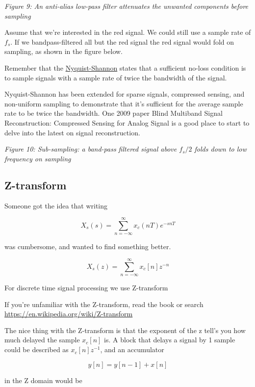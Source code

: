 \emph{Figure 9: An anti-alias low-pass filter attenuates the unwanted
components before sampling}

Assume that we're interested in the red signal. We could still use a
sample rate of \(f_s\). If we bandpass-filtered all but the red signal
the red signal would fold on sampling, as shown in the figure below.

Remember that the
\href{https://en.wikipedia.org/wiki/Nyquist–Shannon_sampling_theorem}{Nyquist-Shannon}
states that a sufficient no-loss condition is to sample signals with a
sample rate of twice the bandwidth of the signal.

Nyquist-Shannon has been extended for sparse signals, compressed
sensing, and non-uniform sampling to demonstrate that it's sufficient
for the average sample rate to be twice the bandwidth. One 2009 paper
Blind Multiband Signal Reconstruction: Compressed Sensing for Analog
Signal  is a good place to start to
delve into the latest on signal reconstruction.


{
\centering
{}
}

\emph{Figure 10: Sub-sampling: a band-pass filtered signal above
\(f_s/2\) folds down to low frequency on sampling}

\subsection{Z-transform}\label{z-transform}

Someone got the idea that writing

\[ X_s(s) = \sum_{n=-\infty}^{\infty}x_c(nT)e^{-snT}\]

was cumbersome, and wanted to find something better.

\[ X_s(z) = \sum_{n=-\infty}^{\infty}x_c[n]z^{-n}\]

For discrete time signal processing we use Z-transform

If you're unfamiliar with the Z-transform, read the book or search
\url{https://en.wikipedia.org/wiki/Z-transform}

The nice thing with the Z-transform is that the exponent of the z tell's
you how much delayed the sample \(x_c[n]\) is. A block that delays a
signal by 1 sample could be described as \(x_c[n] z^{-1}\), and an
accumulator

\[ y[n] = y[n-1] + x[n] \]

in the Z domain would be

